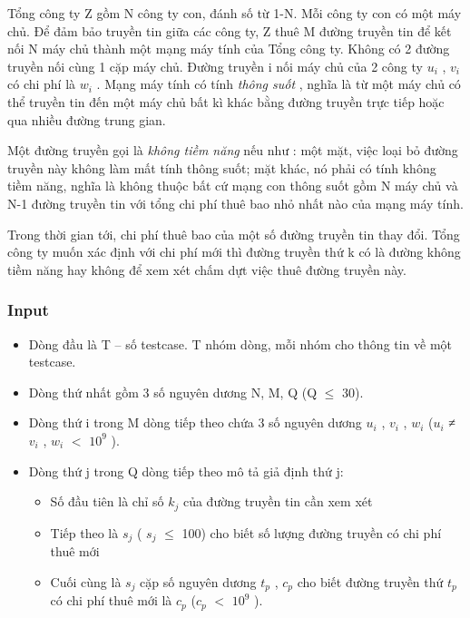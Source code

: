 

Tổng công ty Z gồm N công ty con, đánh số từ 1-N. Mỗi công ty con có một máy chủ. Để đảm bảo truyền tin giữa các công ty, Z thuê M đường truyền tin để kết nối N máy chủ thành một mạng máy tính của Tổng công ty. Không có 2 đường truyền nối cùng 1 cặp máy chủ. Đường truyền i nối máy chủ của 2 công ty $u_{i}$ , $v_{i}$ có chi phí là $w_{i}$ . Mạng máy tính có tính \emph{ thông suốt } , nghĩa là từ một máy chủ có thể truyền tin đến một máy chủ bất kì khác bằng đường truyền trực tiếp hoặc qua nhiều đường trung gian.

Một đường truyền gọi là \emph{ không tiềm năng } nếu như : một mặt, việc loại bỏ đường truyền này không làm mất tính thông suốt; mặt khác, nó phải có tính không tiềm năng, nghĩa là không thuộc bất cứ mạng con thông suốt gồm N máy chủ và N-1 đường truyền tin với tổng chi phí thuê bao nhỏ nhất nào của mạng máy tính.

Trong thời gian tới, chi phí thuê bao của một số đường truyền tin thay đổi. Tổng công ty muốn xác định với chi phí mới thì đường truyền thứ k có là đường không tiềm năng hay không để xem xét chấm dựt việc thuê đường truyền này.

\subsubsection{Input}
\begin{itemize}
	\item Dòng đầu là T – số testcase. T nhóm dòng, mỗi nhóm cho thông tin về một testcase.
	\item Dòng thứ nhất gồm 3 số nguyên dương N, M, Q (Q  $\le$  30).
	\item Dòng thứ i trong M dòng tiếp theo chứa 3 số nguyên dương $u_{i}$ , $v_{i}$ , $w_{i}$ ($u_{i}$ ≠ $v_{i}$ , $w_{i}$ $<$ $10^{9}$ ).
	\item Dòng thứ j trong Q dòng tiếp theo mô tả giả định thứ j:
\begin{itemize}
	\item Số đầu tiên là chỉ số $k_{j}$ của đường truyền tin cần xem xét
	\item Tiếp theo là $s_{j}$ ( $s_{j}$  $\le$  100) cho biết số lượng đường truyền có chi phí thuê mới
	\item Cuối cùng là $s_{j}$ cặp số nguyên dương $t_{p}$ , $c_{p}$ cho biết đường truyền thứ $t_{p}$ có chi phí thuê mới là $c_{p}$ ($c_{p}$ $<$ $10^{9}$ ).
\end{itemize}
\end{itemize}

